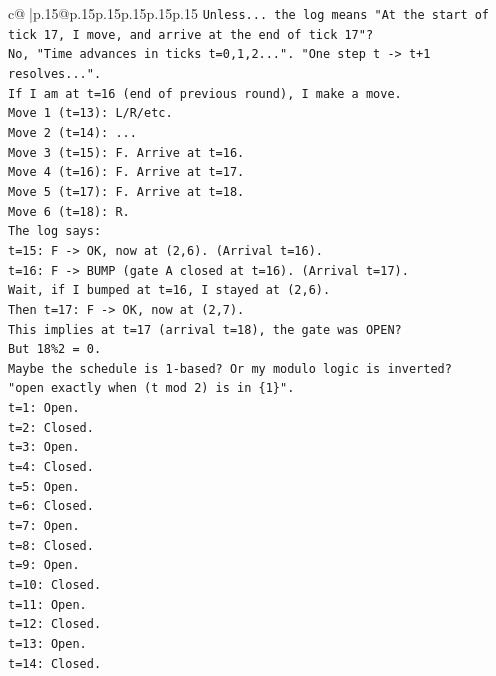 \documentclass{article}
\begin{document}
{\begin{supertabular}{c@{$\;$}|p{.15\linewidth}@{}p{.15\linewidth}p{.15\linewidth}p{.15\linewidth}p{.15\linewidth}p{.15\linewidth}}
{{{\texttt{Unless... the log means "At the start of tick 17, I move, and arrive at the end of tick 17"?} \\
\texttt{No, "Time advances in ticks t=0,1,2...". "One step t {-}> t+1 resolves...".} \\
\texttt{If I am at t=16 (end of previous round), I make a move.} \\
\texttt{Move 1 (t=13): L/R/etc.} \\
\texttt{Move 2 (t=14): ...} \\
\texttt{Move 3 (t=15): F. Arrive at t=16.} \\
\texttt{Move 4 (t=16): F. Arrive at t=17.} \\
\texttt{Move 5 (t=17): F. Arrive at t=18.} \\
\texttt{Move 6 (t=18): R.} \\
\texttt{The log says:} \\
\texttt{t=15: F {-}> OK, now at (2,6). (Arrival t=16).} \\
\texttt{t=16: F {-}> BUMP (gate A closed at t=16). (Arrival t=17).} \\
\texttt{Wait, if I bumped at t=16, I stayed at (2,6).} \\
\texttt{Then t=17: F {-}> OK, now at (2,7).} \\
\texttt{This implies at t=17 (arrival t=18), the gate was OPEN?} \\
\texttt{But 18\%2 = 0.} \\
\texttt{Maybe the schedule is 1{-}based? Or my modulo logic is inverted?} \\
\texttt{"open exactly when (t mod 2) is in \{1\}".} \\
\texttt{t=1: Open.} \\
\texttt{t=2: Closed.} \\
\texttt{t=3: Open.} \\
\texttt{t=4: Closed.} \\
\texttt{t=5: Open.} \\
\texttt{t=6: Closed.} \\
\texttt{t=7: Open.} \\
\texttt{t=8: Closed.} \\
\texttt{t=9: Open.} \\
\texttt{t=10: Closed.} \\
\texttt{t=11: Open.} \\
\texttt{t=12: Closed.} \\
\texttt{t=13: Open.} \\
\texttt{t=14: Closed.} \\
}}}
\end{supertabular}}
\end{document}
